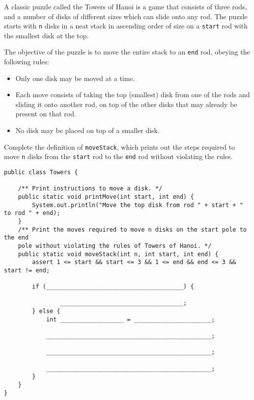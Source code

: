\question A classic puzzle called the Towers of Hanoi is a game that consists of three rods, and a number of disks of different sizes which can slide onto any rod. The puzzle starts with \texttt{n} disks in a neat stack in ascending order of size on a \texttt{start} rod with the smallest disk at the top.

The objective of the puzzle is to move the entire stack to an \texttt{end} rod, obeying the following rules:
\begin{itemize}
\item Only one disk may be moved at a time.
\item Each move consists of taking the top (smallest) disk from one of the rods and sliding it onto another rod, on top of the other disks that may already be present on that rod.
\item No disk may be placed on top of a smaller disk.
\end{itemize}

Complete the definition of \texttt{moveStack}, which prints out the steps required to move \texttt{n} disks from the \texttt{start} rod to the \texttt{end} rod without violating the rules.

\ifprintanswers\else
\begin{lstlisting}
public class Towers {

    /** Print instructions to move a disk. */
    public static void printMove(int start, int end) {
        System.out.println("Move the top disk from rod " + start + " to rod " + end);
    }
    /** Print the moves required to move n disks on the start pole to the end
    pole without violating the rules of Towers of Hanoi. */
    public static void moveStack(int n, int start, int end) {
        assert 1 <= start && start <= 3 && 1 <= end && end <= 3 && start != end;

        if (_______________________________________) {
        
                ___________________________________;
        } else {
            int __________________ = ______________________;
            
            _______________________________________________;

            _______________________________________________;

            _______________________________________________;
        }
    }
}
\end{lstlisting}
\fi

